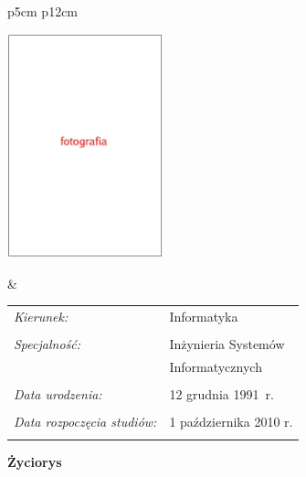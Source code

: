 \begin{titlepage}
    \newpage\thispagestyle{empty}
    \begin{tabular}{p{5cm} p{12cm}}
    \begin{minipage}{5cm}
    \center
    \includegraphics[height=6.5cm,width=4.5cm]{img/foto.jpg}
    \end{minipage}
    &
    \begin{minipage}{12cm}
    \begin{flushleft}
    \par\noindent\vspace{1\baselineskip}
    \begin{tabular}[h]{l l}
	{\normalsize\it Kierunek:} & {\normalsize Informatyka} \\ \\
    {\normalsize\it Specjalność:} & {\normalsize Inżynieria Systemów} \\ & {\normalsize Informatycznych}  \\ \\
    {\normalsize\it Data urodzenia:} & {\normalsize 12 grudnia 1991~r.} \\ \\
    {\normalsize\it Data rozpoczęcia studiów:} & {\normalsize 1 października 2010 r.} \\ \\
    \end{tabular}
    \par\noindent\vspace{1\baselineskip}
    \end{flushleft}
    \end{minipage}
    \end{tabular}
    \vspace*{1\baselineskip}
    \begin{center}
	{\large\bfseries Życiorys}\par\bigskip
    \end{center}


\end{titlepage}

